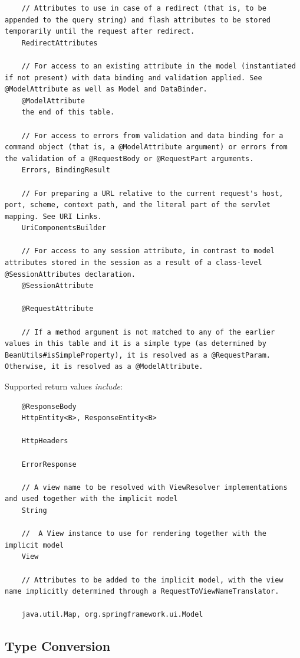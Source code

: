 \documentclass{scrartcl}
\begin{document}
\begin{lstlisting}
    // Attributes to use in case of a redirect (that is, to be appended to the query string) and flash attributes to be stored temporarily until the request after redirect.
    RedirectAttributes

    // For access to an existing attribute in the model (instantiated if not present) with data binding and validation applied. See @ModelAttribute as well as Model and DataBinder.
    @ModelAttribute
    the end of this table.

    // For access to errors from validation and data binding for a command object (that is, a @ModelAttribute argument) or errors from the validation of a @RequestBody or @RequestPart arguments.
    Errors, BindingResult

    // For preparing a URL relative to the current request's host, port, scheme, context path, and the literal part of the servlet mapping. See URI Links.
    UriComponentsBuilder

    // For access to any session attribute, in contrast to model attributes stored in the session as a result of a class-level @SessionAttributes declaration.
    @SessionAttribute

    @RequestAttribute

    // If a method argument is not matched to any of the earlier values in this table and it is a simple type (as determined by BeanUtils#isSimpleProperty), it is resolved as a @RequestParam. Otherwise, it is resolved as a @ModelAttribute.
    \end{lstlisting}

    Supported return values \textit{include}:

    \begin{lstlisting}
    @ResponseBody
    HttpEntity<B>, ResponseEntity<B>

    HttpHeaders

    ErrorResponse

    // A view name to be resolved with ViewResolver implementations and used together with the implicit model
    String

    //  A View instance to use for rendering together with the implicit model
    View

    // Attributes to be added to the implicit model, with the view name implicitly determined through a RequestToViewNameTranslator.

    java.util.Map, org.springframework.ui.Model
    \end{lstlisting}

\subsection{Type Conversion}
\end{document}
